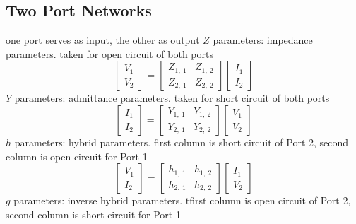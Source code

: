 \documentclass[a4paper,11pt]{article}
\begin{document}
	\subsection{Two Port Networks}
	\begin{outline}[enumerate]
		\1 one port serves as input, the other as output
		\1 $Z$ parameters: impedance parameters. taken for open circuit of both ports
		\begin{equation*}
			\begin{bmatrix} V_{1} \\ V_{2} \end{bmatrix} = \begin{bmatrix} Z_{1,~1} & Z_{1,~2} \\ Z_{2,~1} & Z_{2,~2} \end{bmatrix} \begin{bmatrix} I_{1} \\ I_{2} \end{bmatrix}
		\end{equation*}
		\1 $Y$ parameters: admittance parameters. taken for short circuit of both ports
		\begin{equation*}
			\begin{bmatrix} I_{1} \\ I_{2} \end{bmatrix} = \begin{bmatrix} Y_{1,~1} & Y_{1,~2} \\ Y_{2,~1} & Y_{2,~2} \end{bmatrix} \begin{bmatrix} V_{1} \\ V_{2} \end{bmatrix}
		\end{equation*}
		\1 $h$ parameters: hybrid parameters. first column is short circuit of Port 2, second column is open circuit for Port 1
		\begin{equation*}
			\begin{bmatrix} V_{1} \\ I_{2} \end{bmatrix} = \begin{bmatrix} h_{1,~1} & h_{1,~2} \\ h_{2,~1} & h_{2,~2} \end{bmatrix} \begin{bmatrix} I_{1} \\ V_{2} \end{bmatrix}
		\end{equation*}
		\1 $g$ parameters: inverse hybrid parameters. tfirst column is open circuit of Port 2, second column is short circuit for Port 1

\end{outline}
\end{document}
